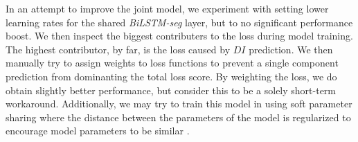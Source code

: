 In an attempt to improve the joint model, we experiment with setting lower
learning rates for the shared \textit{BiLSTM-seg} layer, but to no significant
performance boost.  We then inspect the biggest contributers to the loss during
model training.  The highest contributor, by far, is the loss caused by $DI$
prediction.  We then manually try to assign weights to loss functions to
prevent a single component prediction from dominanting the total loss score.
By weighting the loss, we do obtain slightly better performance, but consider
this to be a solely short-term workaround. 
Additionally, we may try to train this model in using soft parameter sharing
 where the distance between the parameters of the
model is regularized to encourage model parameters to be similar
\citep{ruder2017overview}.


